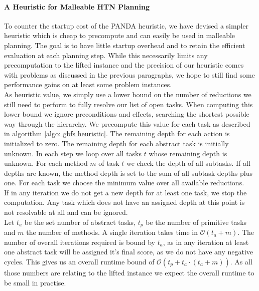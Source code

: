 \paragraph{A Heuristic for Malleable HTN Planning}
To counter the startup cost of the PANDA heuristic, we have devised a simpler heuristic which is cheap to precompute and can easily be used in malleable planning. The goal is to have little startup overhead and to retain the efficient evaluation at each planning step. While this necessarily limits any precomputation to the lifted instance and the precision of our heuristic comes with problems as discussed in the previous paragraphs, we hope to still find some performance gains on at least some problem instances. \\
As heuristic value, we simply use a lower bound on the number of reductions we still need to perform to fully resolve our list of open tasks. When computing this lower bound we ignore preconditions and effects, searching the shortest possible way through the hierarchy. We precompute this value for each task as described in algorithm \ref{algo: gbfs heuristic}. The remaining depth for each action is initialized to zero. The remaining depth for each abstract task is initially unknown. In each step we loop over all tasks $t$ whose remaining depth is unknown. For each method $m$ of task $t$ we check the depth of all subtasks. If all depths are known, the method depth is set to the sum of all subtask depths plus one. For each task we choose the minimum value over all available reductions. \\
If in any iteration we do not get a new depth for at least one task, we stop the computation. Any task which does not have an assigned depth at this point is not resolvable at all and can be ignored. \\
Let $t_a$ be the set number of abstract tasks, $t_p$ be the number of primitive tasks and $m$ the number of methods. A single iteration takes time in $\mathcal{O}(t_a + m)$. The number of overall iterations required is bound by $t_a$, as in any iteration at least one abstract task will be assigned it's final score, as we do not have any negative cycles. This gives us an overall runtime bound of $\mathcal{O}(t_p + t_a \cdot(t_a + m))$. As all those numbers are relating to the lifted instance we expect the overall runtime to be small in practise.

